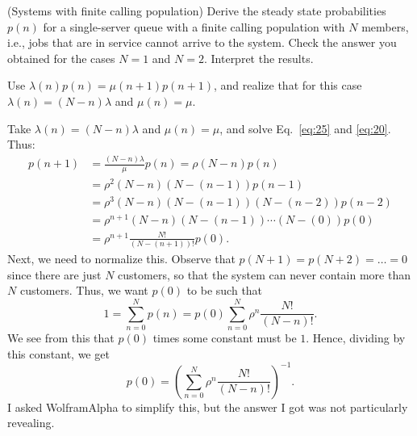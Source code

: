 \begin{exercise}(Systems with finite calling population)
 Derive the steady state probabilities $p(n)$ for a
    single-server queue with a finite calling population with $N$
    members, i.e., jobs that are in service cannot arrive to the system.
 Check the answer you obtained for the cases $N=1$ and
    $N=2$. Interpret the results.
  \begin{hint}
Use $\lambda(n) p(n) = \mu(n+1)p(n+1)$, and realize that for
      this case $\lambda(n) = (N-n)\lambda$ and $\mu(n) = \mu$.
  \end{hint}
    \begin{solution}
 Take $\lambda(n) = (N-n)\lambda$ and $\mu(n) = \mu$, and solve
    Eq.~\eqref{eq:25} and \eqref{eq:20}.  Thus: 
    \begin{align*}
       p(n+1) 
& = \frac{(N-n)\lambda}\mu p(n) 
 = \rho (N-n) p(n) \\
& = \rho^2 (N-n)(N-(n-1))p(n-1) \\
& = \rho^3 (N-n)(N-(n-1))(N-(n-2)) p(n-2) \\
& = \rho^{n+1} (N-n)(N-(n-1))\cdots(N-(0)) p(0) \\
&= \rho^{n+1} \frac{N!}{(N-(n+1))!}p(0). 
    \end{align*}
    Next, we need to normalize this. Observe that
    $p(N+1)=p(N+2) = \ldots = 0$ since there are just $N$ customers,
    so that the system can never contain more than $N$
    customers. Thus, we want $p(0)$ to be such that
\begin{equation*}
  1 = \sum_{n=0}^N p(n) = p(0) \sum_{n=0}^N \rho^n \frac{N!}{(N-n)!}.
\end{equation*}
We see from this that $p(0)$ times some constant must be $1$. Hence, dividing by this constant, we get 
\begin{equation*}
  p(0) = \left(\sum_{n=0}^N \rho^n \frac{N!}{(N-n)!}\right)^{-1}.
\end{equation*}
I asked WolframAlpha to simplify this, but the answer I got was not particularly revealing. 
    \end{solution}
\end{exercise}

